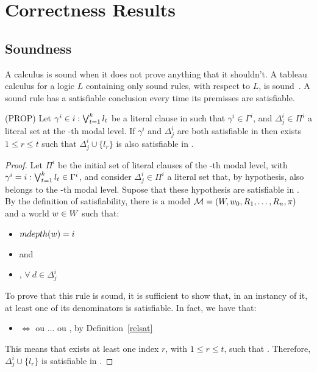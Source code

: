 \section{Correctness Results}
\label{sec:correctnessresults}

\subsection{Soundness}
\label{sec:sound}

A calculus is sound when it does not prove anything that it shouldn't. A tableau
calculus for a logic $L$ containing only sound rules, with respect to $L$, is
sound~\cite{gore2009clausal}. A sound rule has a satisfiable conclusion every
time its premisses are satisfiable.

\begin{lemma}{(PROP)} Let $\gamma^i \in i: \bigvee^{k}_{t = 1}l_{t}$ be a literal clause in
     such that $\gamma^i \in \Gamma^i$, and $\Delta^i_j \in \Pi^i$ a
    literal set at the \ml-th modal level. If $\gamma^i$ and $\Delta^i_j$ are
    both satisfiable in  then exists $1 \leq r \leq t$ such that
    $\Delta^i_j \cup \{l_r\}$ is also satisfiable in .
\end{lemma}
\begin{proof}
   Let $\Pi^i$ be the initial set of literal clauses of the \ml-th modal level,
   with $\gamma^i = i: \bigvee^{k}_{t = 1}l_{t} \in \Gamma^i$, and consider $\Delta^i_j \in
   \Pi^i$ a literal set that, by hypothesis, also belongs to the \ml-th modal
   level. Supose that these hypothesis are satisfiable in . By
   the definition of satisfiability, there is a model $\mathcal{M} = (W,
   w_0, R_1, \ldots, R_n, \pi)$ and a world $w \in W$ such that:
   \begin{itemize}
       \item $mdepth(w) = i$ 
       \item {} and
       \item {}, $\forall~d \in \Delta^i_j$
   \end{itemize}
   To prove that this rule is sound, it is sufficient to show that, in an
   instancy of it, at least one of its denominators is satisfiable. In fact, we
   have that:
   \begin{itemize}
       \item {} $\iff$
            ou $\ldots$ ou , by
           Definition~\ref{relsat}
   \end{itemize}
   This means that exists at least one index $r$, with $1 \leq r \leq t$, such
   that . Therefore, $\Delta^i_j \cup \{l_r\}$ is
   satisfiable in .
\end{proof}

